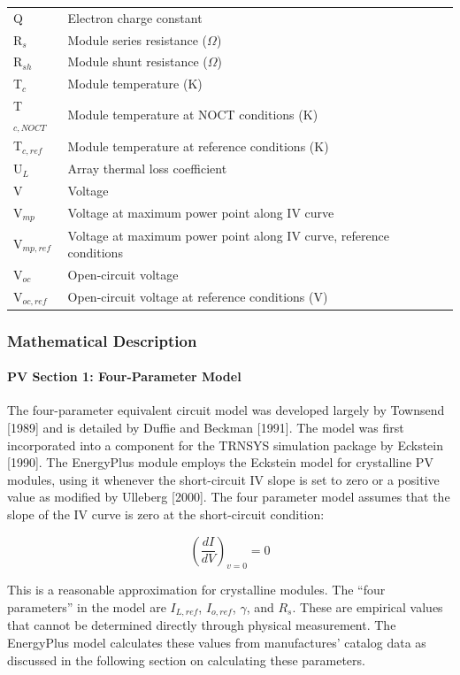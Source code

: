 \begin{longtable}[l]{p{1.2in}p{4.8in}}
Q & Electron charge constant \tabularnewline
R\(_{s}\) & Module series resistance ($\Omega$) \tabularnewline
R\(_{sh}\) & Module shunt resistance ($\Omega$) \tabularnewline
T\(_{c}\)­ & Module temperature (K) \tabularnewline
T\(_{c,NOCT}\) & Module temperature at NOCT conditions (K) \tabularnewline
T\(_{c,ref}\) & Module temperature at reference conditions (K) \tabularnewline
U\(_{L}\) & Array thermal loss coefficient \tabularnewline
V & Voltage \tabularnewline
V\(_{mp}\) & Voltage at maximum power point along IV curve \tabularnewline
V\(_{mp,ref}\) & Voltage at maximum power point along IV curve, reference conditions \tabularnewline
V\(_{oc}\)­ & Open-circuit voltage \tabularnewline
V\(_{oc,ref}\) & Open-circuit voltage at reference conditions (V) \tabularnewline
\bottomrule
\end{longtable}

\subsubsection{Mathematical Description}\label{mathematical-description-1}

\paragraph{PV Section 1: Four-Parameter Model}\label{pv-section-1-four-parameter-model}

The four-parameter equivalent circuit model was developed largely by Townsend {[}1989{]} and is detailed by Duffie and Beckman {[}1991{]}. The model was first incorporated into a component for the TRNSYS simulation package by Eckstein {[}1990{]}. The EnergyPlus module employs the Eckstein model for crystalline PV modules, using it whenever the short-circuit IV slope is set to zero or a positive value as modified by Ulleberg {[}2000{]}. The four parameter model assumes that the slope of the IV curve is zero at the short-circuit condition:

\begin{equation}
{\left( {\frac{{dI}}{{dV}}} \right)_{v = 0}} = 0
\end{equation}

This is a reasonable approximation for crystalline modules. The ``four parameters'' in the model are \(I_{L,ref}\), \(I_{o,ref}\), \(\gamma\), and \(R_{s}\). These are empirical values that cannot be determined directly through physical measurement. The EnergyPlus model calculates these values from manufactures' catalog data as discussed in the following section on calculating these parameters.

